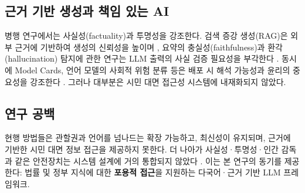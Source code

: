 {\subsection{근거 기반 생성과 책임 있는 AI}
병행 연구에서는 사실성(factuality)과 투명성을 강조한다. 검색 증강 생성(RAG)은 외부 근거에 기반하여 생성의 신뢰성을 높이며 \cite{lewis2020rag}, 요약의 충실성(faithfulness)과 환각(hallucination) 탐지에 관한 연구는 LLM 출력의 사실 검증 필요성을 부각한다 \cite{maynez2020faithfulness, ji2023hallucination}. 동시에 Model Cards, 언어 모델의 사회적 위험 분류 등은 배포 시 해석 가능성과 윤리의 중요성을 강조한다 \cite{mitchell2021modelcards, bender2021stochastic, weidinger2021taxonomy}. 그러나 대부분은 시민 대면 접근성 시스템에 내재화되지 않았다.

\subsection{연구 공백}
현행 방법들은 관할권과 언어를 넘나드는 확장 가능하고, 최신성이 유지되며, 근거에 기반한 시민 대면 정보 접근을 제공하지 못한다. 더 나아가 사실성·투명성·인간 감독과 같은 안전장치는 시스템 설계에 거의 통합되지 않았다 \cite{gama2014drift}. 이는 본 연구의 동기를 제공한다: 법률 및 정부 지식에 대한 \textbf{포용적 접근}을 지원하는 다국어·근거 기반 LLM 프레임워크.

\begin{table}[t]
\centering
\small
{}
\caption{법률 정보 검색과 \emph{다국어 포용적 접근}의 개념적 차이.}
\label{tab:conceptual}
\end{table}


}
